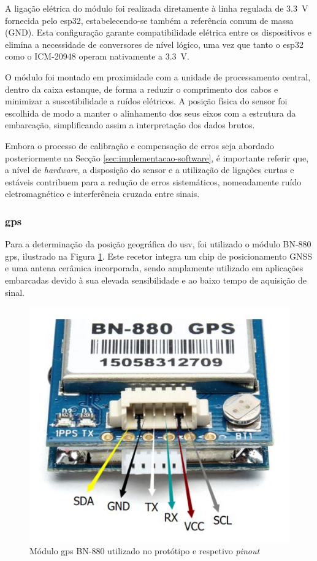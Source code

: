 A ligação elétrica do módulo foi realizada diretamente à linha regulada de 3.3~V fornecida pelo \gls{esp32}, estabelecendo-se também a referência comum de massa (GND). Esta configuração garante compatibilidade elétrica entre os dispositivos e elimina a necessidade de conversores de nível lógico, uma vez que tanto o \gls{esp32} como o ICM-20948 operam nativamente a 3.3~V.

O módulo foi montado em proximidade com a unidade de processamento central, dentro da caixa estanque, de forma a reduzir o comprimento dos cabos e minimizar a suscetibilidade a ruídos elétricos. A posição física do sensor foi escolhida de modo a manter o alinhamento dos seus eixos com a estrutura da embarcação, simplificando assim a interpretação dos dados brutos.  

Embora o processo de calibração e compensação de erros seja abordado posteriormente na Secção \ref{sec:implementacao-software}, é importante referir que, a nível de \emph{hardware}, a disposição do sensor e a utilização de ligações curtas e estáveis contribuem para a redução de erros sistemáticos, nomeadamente ruído eletromagnético e interferência cruzada entre sinais.  
    
\subsubsection{\acrfull{gps}}

Para a determinação da posição geográfica do \gls{usv}, foi utilizado o módulo BN-880 \gls{gps}, ilustrado na Figura \ref{fig:gps}. Este recetor integra um chip de posicionamento GNSS e uma antena cerâmica incorporada, sendo amplamente utilizado em aplicações embarcadas devido à sua elevada sensibilidade e ao baixo tempo de aquisição de sinal.  

\begin{figure}[H]
    \centering
    \includegraphics[width=0.4\linewidth]{figuras/BN-880-pinout.jpg}
    \caption{Módulo \gls{gps} BN-880 utilizado no protótipo e respetivo \emph{pinout}}
    \label{fig:gps}
\end{figure}

